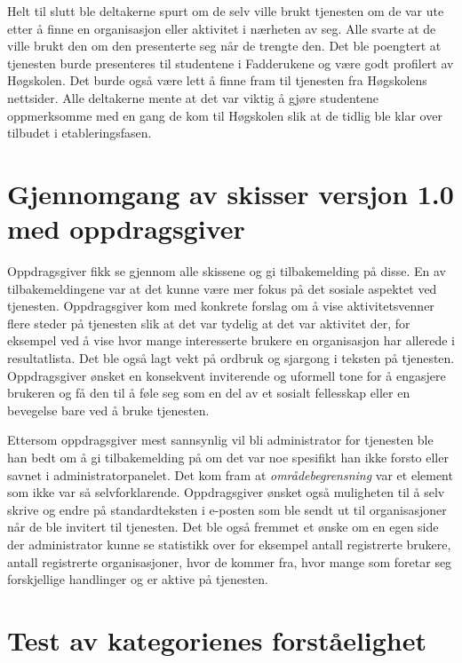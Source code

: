 Helt til slutt ble deltakerne spurt om de selv ville brukt tjenesten om de var ute etter å finne en organisasjon eller aktivitet i nærheten av seg. Alle svarte at de ville brukt den om den presenterte seg når de trengte den. Det ble poengtert at tjenesten burde presenteres til studentene i Fadderukene og være godt profilert av Høgskolen. Det burde også være lett å finne fram til tjenesten fra Høgskolens nettsider. Alle deltakerne mente at det var viktig å gjøre studentene oppmerksomme med en gang de kom til Høgskolen slik at de tidlig ble klar over tilbudet i etableringsfasen.

\section{Gjennomgang av skisser versjon 1.0 med oppdragsgiver}
\label{section:skisser1.0-oppdragsgiver}

Oppdragsgiver fikk se gjennom alle skissene og gi tilbakemelding på disse. En av tilbakemeldingene var at det kunne være mer fokus på det sosiale aspektet ved tjenesten. Oppdragsgiver kom med konkrete forslag om å vise aktivitetsvenner flere steder på tjenesten slik at det var tydelig at det var aktivitet der, for eksempel ved å vise hvor mange interesserte brukere en organisasjon har allerede i resultatlista. Det ble også lagt vekt på ordbruk og sjargong i teksten på tjenesten. Oppdragsgiver ønsket en konsekvent inviterende og uformell tone for å engasjere brukeren og få den til å føle seg som en del av et sosialt fellesskap eller en bevegelse bare ved å bruke tjenesten.

Ettersom oppdragsgiver mest sannsynlig vil bli administrator for tjenesten ble han bedt om å gi tilbakemelding på om det var noe spesifikt han ikke forsto eller savnet i administratorpanelet. Det kom fram at {\em  områdebegrensning} var et element som ikke var så selvforklarende. Oppdragsgiver ønsket også muligheten til å selv skrive og endre på standardteksten i e-posten som ble sendt ut til organisasjoner når de ble invitert til tjenesten. Det ble også fremmet et ønske om en egen side der administrator kunne se statistikk over for eksempel antall registrerte brukere, antall registrerte organisasjoner, hvor de kommer fra, hvor mange som foretar seg forskjellige handlinger og er aktive på tjenesten.

\section{Test av kategorienes forståelighet}


